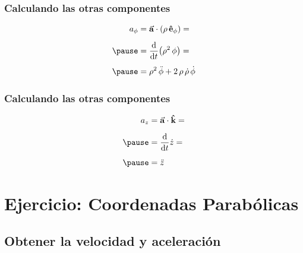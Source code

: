 \documentclass[12pt]{beamer}
\begin{document}
\begin{frame}
\frametitle{Calculando las otras componentes}
\begin{eqnarray*}
\begin{aligned}
a_{\phi} &= \va{a} \cdot (\rho \, \vu{e}_{\phi}) = \\[0.5em] \pause
&= \dv{t} (\rho^{2} \, \phi) = \\[0.5em] \pause
&= \rho^{2} \, \ddot{\phi} + 2 \, \rho \, \dot{\rho} \, \dot{\phi}
\end{aligned}
\end{eqnarray*}
\end{frame}
\begin{frame}
\frametitle{Calculando las otras componentes}
\begin{eqnarray*}
\begin{aligned}
a_{z} &= \va{a} \cdot \vu{k} = \\[0.5em] \pause
&= \dv{t} \dot{z} = \\[0.5em] \pause
&= \ddot{z}
\end{aligned}
\end{eqnarray*}
\end{frame}

\section{Ejercicio: Coordenadas Parabólicas}
\subsection{Obtener la velocidad y aceleración}
\end{document}
